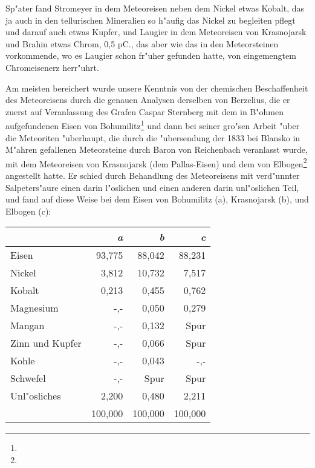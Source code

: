 \documentclass[a4paper, 11pt, oneside]{article}
\begin{document}
Sp"ater fand Stromeyer in dem Meteoreisen neben dem Nickel etwas Kobalt, das ja auch in den tellurischen Mineralien so h"aufig das Nickel zu begleiten pflegt und darauf auch etwas Kupfer, und Laugier in dem Meteoreisen von Krasnojarsk und Brahin etwas Chrom, 0,5 pC., das aber wie das in den Meteorsteinen vorkommende, wo es Laugier schon fr"uher gefunden hatte, von eingemengtem Chromeisenerz herr"uhrt.

Am meisten bereichert wurde unsere Kenntnis von der chemischen Beschaffenheit des Meteoreisens durch die genauen Analysen derselben von Berzelius, die er zuerst auf Veranlassung des Grafen Caspar Sternberg mit dem in B"ohmen aufgefundenen Eisen von Bohumilitz\footnote{} und dann bei seiner gro"sen Arbeit "uber die Meteoriten "uberhaupt, die durch die "ubersendung der 1833 bei Blansko in M"ahren gefallenen Meteorsteine durch Baron von Reichenbach veranlasst wurde, mit dem Meteoreisen von Krasnojarsk (dem Pallas-Eisen) und dem von Elbogen\footnote{} angestellt hatte. Er schied durch Behandlung des Meteoreisens mit verd"unnter Salpeters"aure einen darin l"oslichen und einen anderen darin unl"oslichen Teil, und fand auf diese Weise bei dem Eisen von Bohumilitz (a), Krasnojarsk (b), und Elbogen (c):
\begin{center}
\begin{tabular}{ |l|r|r|r| }
    \hline
     & \emph{a} & \emph{b} & \emph{c}\\
    \hline\hline
    Eisen & 93,775 & 88,042 & 88,231\\\hline
    Nickel & 3,812 & 10,732 & 7,517\\\hline
    Kobalt & 0,213 & 0,455 & 0,762\\\hline
    Magnesium & -,- & 0,050 & 0,279\\\hline
    Mangan & -,- & 0,132 & Spur\\\hline
    Zinn und Kupfer & -,- & 0,066 & Spur\\\hline
    Kohle & -,- & 0,043 & -,-\\\hline
    Schwefel & -,- & Spur & Spur\\\hline
    Unl"osliches & 2,200 & 0,480 & 2,211\\\hline
    & 100,000 & 100,000 & 100,000\\
    \hline
\end{tabular}
\end{center}
\end{document}
